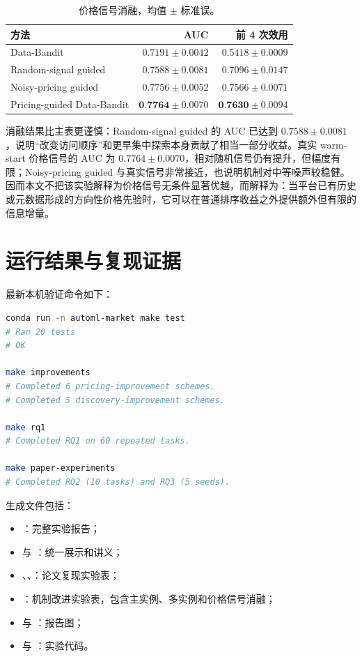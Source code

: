 \documentclass[11pt,a4paper]{ctexart}
\theoremstyle{definition}
\begin{document}
\begin{table}[H]
\centering
\small
\caption{价格信号消融，均值 $\pm$ 标准误。}
\begin{tabular}{lrr}
\toprule
方法 & AUC & 前 4 次效用\\
\midrule
Data-Bandit & $0.7191\pm0.0042$ & $0.5418\pm0.0009$\\
Random-signal guided & $0.7588\pm0.0081$ & $0.7096\pm0.0147$\\
Noisy-pricing guided & $0.7756\pm0.0052$ & $0.7566\pm0.0071$\\
Pricing-guided Data-Bandit & $\textbf{0.7764}\pm0.0070$ & $\textbf{0.7630}\pm0.0094$\\
\bottomrule
\end{tabular}
\end{table}

消融结果比主表更谨慎：Random-signal guided 的 AUC 已达到 $0.7588\pm0.0081$，说明“改变访问顺序”和更早集中探索本身贡献了相当一部分收益。真实 warm-start 价格信号的 AUC 为 $0.7764\pm0.0070$，相对随机信号仍有提升，但幅度有限；Noisy-pricing guided 与真实信号非常接近，也说明机制对中等噪声较稳健。因而本文不把该实验解释为价格信号无条件显著优越，而解释为：当平台已有历史或元数据形成的方向性价格先验时，它可以在普通排序收益之外提供额外但有限的信息增量。

\section{运行结果与复现证据}

最新本机验证命令如下：
\begin{lstlisting}[language=bash]
conda run -n automl-market make test
# Ran 20 tests
# OK

make improvements
# Completed 6 pricing-improvement schemes.
# Completed 5 discovery-improvement schemes.

make rq1
# Completed RQ1 on 60 repeated tasks.

make paper-experiments
# Completed RQ2 (10 tasks) and RQ3 (5 seeds).
\end{lstlisting}

生成文件包括：
\begin{itemize}
\item {}：完整实验报告；
\item {} 与 ：统一展示和讲义；
\item {}、、：论文复现实验表；
\item {}：机制改进实验表，包含主实例、多实例和价格信号消融；
\item {} 与 ：报告图；
\item {} 与 ：实验代码。
\end{itemize}
\end{document}
